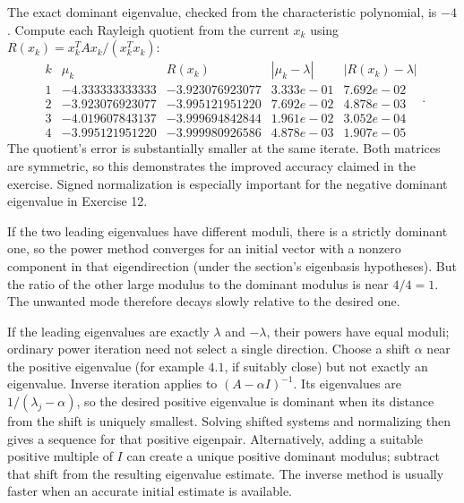 The exact dominant eigenvalue, checked from the characteristic
polynomial, is $-4$. Compute each Rayleigh quotient
from the current $x_k$ using $R(x_k)=x_k^TAx_k/(x_k^Tx_k)$:
\[\begin{array}{c|rr|rr}
k&\mu_k&R(x_k)&|\mu_k-\lambda|&|R(x_k)-\lambda|\\\hline
1&-4.333333333333&-3.923076923077&3.333e-01&7.692e-02\\
2&-3.923076923077&-3.995121951220&7.692e-02&4.878e-03\\
3&-4.019607843137&-3.999694842844&1.961e-02&3.052e-04\\
4&-3.995121951220&-3.999980926586&4.878e-03&1.907e-05\end{array}.\]
The quotient's error is substantially smaller at the same iterate.
Both matrices are symmetric, so this demonstrates the improved
accuracy claimed in the exercise. Signed normalization is especially
important for the negative dominant eigenvalue in Exercise 12.

If the two leading eigenvalues have different moduli, there is a
strictly dominant one, so the power method converges for an initial
vector with a nonzero component in that eigendirection (under the
section's eigenbasis hypotheses). But the ratio of the other large
modulus to the dominant modulus is near $4/4=1$. The unwanted
mode therefore decays slowly relative to the desired one.

If the leading eigenvalues are exactly $\lambda$ and $-\lambda$,
their powers have equal moduli; ordinary power iteration need not
select a single direction. Choose a shift $\alpha$ near the positive
eigenvalue (for example $4.1$, if suitably close) but not exactly an
eigenvalue. Inverse iteration applies to $(A-\alpha I)^{-1}$.
Its eigenvalues are $1/(\lambda_j-\alpha)$, so the desired positive
eigenvalue is dominant when its distance from the shift is uniquely
smallest. Solving shifted systems and normalizing then gives a
sequence for that positive eigenpair.
Alternatively, adding a suitable positive multiple of $I$ can create
a unique positive dominant modulus; subtract that shift from the
resulting eigenvalue estimate. The inverse method is usually faster
when an accurate initial estimate is available.

